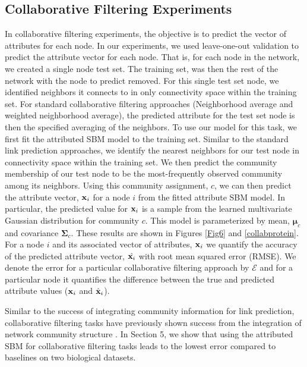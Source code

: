 \subsection{Collaborative Filtering Experiments}
In collaborative filtering experiments, the objective is to predict the vector of attributes for each node. In our experiments, we used leave-one-out validation to predict the attribute vector for each node. That is, for each node in the network, we created a single node test set. The training set, was then the rest of the network with the node to predict removed. For this single test set node, we identified neighbors it connects to in only connectivity space within the training set. For standard collaborative filtering approaches (Neighborhood average and weighted neighborhood average), the predicted attribute for the test set node is then the specified averaging of the neighbors. To use our model for this task, we first fit the attributed SBM model to the training set. Similar to the standard link prediction approaches, we identify the nearest neighbors for our test node in connectivity space within the training set. We then predict the community membership of our test node to be the most-frequently observed community among its neighbors. Using this community assignment, $c$, we can then predict the attribute vector, ${\bf x}_{i}$ for a node $i$ from the fitted attribute SBM model. In particular, the predicted value for ${\bf x}_{i}$ is a sample from the learned multivariate Gaussian distribution for community $c$. This model is parameterized by mean, $\boldsymbol{\mu}_{c}$ and covariance $\boldsymbol{\Sigma}_{c}$. These results are shown in Figures \ref{Fig6} and \ref{collabprotein}. For a node $i$ and its associated vector of attributes, ${\bf x}_{i}$ we quantify the accuracy of the predicted attribute vector, $\hat{{\bf x}_{i}}$ with root mean squared error (RMSE). We denote the error for a particular collaborative filtering approach by $\mathcal{E}$ and for a particular node it quantifies the difference between the true and predicted attribute values (${\bf x}_{i}$ and $\hat{\bf x}_{i}$).  

Similar to the success of integrating community information for link prediction, collaborative filtering tasks have previously shown success from the integration of network community structure \cite{collabComm}. In Section 5, we show that using the attributed SBM for collaborative filtering tasks leads to the lowest error compared to baselines on two biological datasets. 

